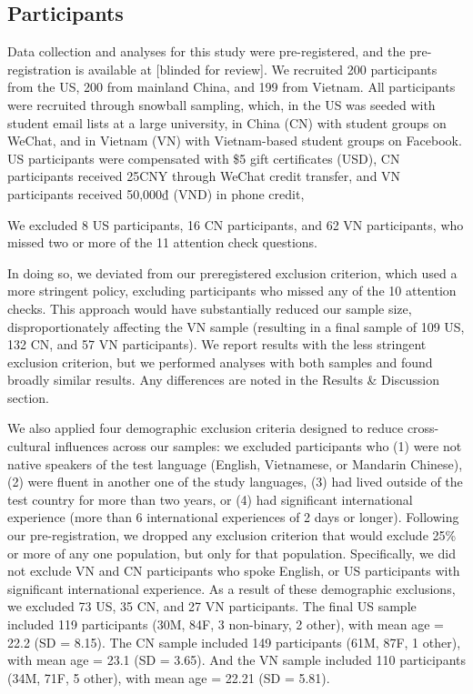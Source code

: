 \documentclass[10pt, letterpaper]{article}
\begin{document}
\hypertarget{participants}{%
\subsection{Participants}\label{participants}}

Data collection and analyses for this study were pre-registered, and the
pre-registration is available at {[}blinded for review{]}. We recruited
200 participants from the US, 200 from mainland China, and 199 from
Vietnam. All participants were recruited through snowball sampling,
which, in the US was seeded with student email lists at a large
university, in China (CN) with student groups on WeChat, and in Vietnam
(VN) with Vietnam-based student groups on Facebook. US participants were
compensated with \$5 gift certificates (USD), CN participants received
25CNY through WeChat credit transfer, and VN participants received
50,000₫ (VND) in phone credit,

We excluded 8 US participants, 16 CN participants, and 62 VN
participants, who missed two or more of the 11 attention check
questions.

In doing so, we deviated from our preregistered exclusion criterion,
which used a more stringent policy, excluding participants who missed
any of the 10 attention checks. This approach would have substantially
reduced our sample size, disproportionately affecting the VN sample
(resulting in a final sample of 109 US, 132 CN, and 57 VN participants).
We report results with the less stringent exclusion criterion, but we
performed analyses with both samples and found broadly similar results.
Any differences are noted in the Results \& Discussion section.

We also applied four demographic exclusion criteria designed to reduce
cross-cultural influences across our samples: we excluded participants
who (1) were not native speakers of the test language (English,
Vietnamese, or Mandarin Chinese), (2) were fluent in another one of the
study languages, (3) had lived outside of the test country for more than
two years, or (4) had significant international experience (more than 6
international experiences of 2 days or longer). Following our
pre-registration, we dropped any exclusion criterion that would exclude
25\% or more of any one population, but only for that population.
Specifically, we did not exclude VN and CN participants who spoke
English, or US participants with significant international experience.
As a result of these demographic exclusions, we excluded 73 US, 35 CN,
and 27 VN participants. The final US sample included 119 participants
(30M, 84F, 3 non-binary, 2 other), with mean age = 22.2 (SD = 8.15). The
CN sample included 149 participants (61M, 87F, 1 other), with mean age =
23.1 (SD = 3.65). And the VN sample included 110 participants (34M, 71F,
5 other), with mean age = 22.21 (SD = 5.81).
\end{document}
